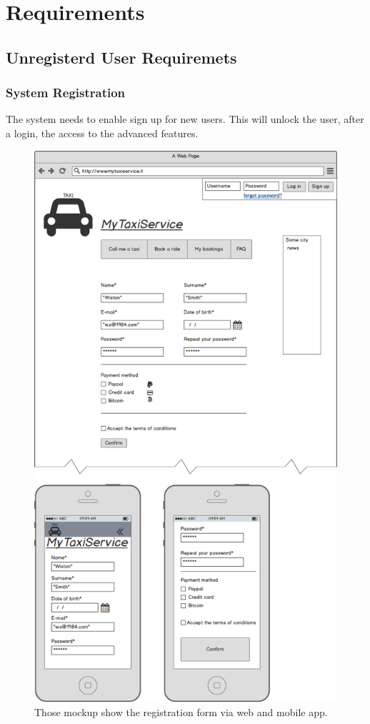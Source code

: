 \section{Requirements}
	\subsection {Unregisterd User Requiremets}
		\subsubsection {System Registration}
			The system needs to enable sign up for new users. This will unlock the user, after a login, the access to the advanced features.
			\begin{figure}[!h]
				\includegraphics[height=0.7\textheight]{mockup/signup.png}
				\caption{Those mockup show the registration form via web and mobile app.}
			\end{figure}
			\newpage
